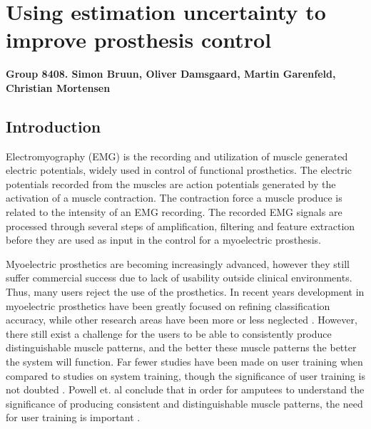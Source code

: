 
\chapter*{Using estimation uncertainty to improve prosthesis control}

\textbf{Group 8408. Simon Bruun, Oliver Damsgaard, Martin Garenfeld, Christian Mortensen}

\section*{Introduction}

Electromyography (EMG) is the recording and utilization of muscle generated electric potentials, widely used in control of functional prosthetics. The electric potentials recorded from the muscles are action potentials generated by the activation of a muscle contraction. The contraction force a muscle produce is related to the intensity of an EMG recording. The recorded EMG signals are processed through several steps of amplification, filtering and feature extraction before they are used as input in the control for a myoelectric prosthesis. \cite{Cram2012, Fougner2012}

Myoelectric prosthetics are becoming increasingly advanced, however they still suffer commercial success due to lack of usability outside clinical environments. \cite{Hwang2017, Jiang2012, Scheme2010} Thus, many users reject the use of the prosthetics. 
In recent years development in myoelectric prosthetics have been greatly focused on refining classification accuracy, while other research areas have been more or less neglected \cite{Jiang2012}. However, there still exist a challenge for the users to be able to consistently produce distinguishable muscle patterns, and the better these muscle patterns the better the system will function. \cite{Powell2014} Far fewer studies have been made on user training when compared to studies on system training, though the significance of user training is not doubted \cite{Fang2017}. Powell et. al conclude that in order for amputees to understand the significance of producing consistent and distinguishable muscle patterns, the need for user training is important \cite{Powell2013}.

